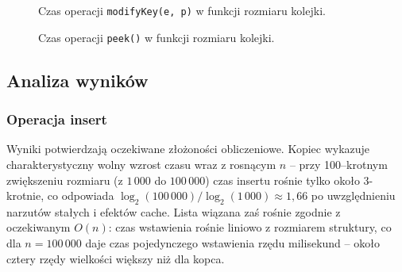 \begin{figure}[H]
\centering
{}
\caption{Czas operacji \texttt{modifyKey(e, p)} w funkcji rozmiaru kolejki.}
\end{figure}

\begin{figure}[H]
\centering
{}
\caption{Czas operacji \texttt{peek()} w funkcji rozmiaru kolejki.}
\end{figure}

\subsection{Analiza wyników}

\subsubsection{Operacja insert}

Wyniki potwierdzają oczekiwane złożoności obliczeniowe. Kopiec wykazuje
charakterystyczny wolny wzrost czasu wraz z rosnącym $n$ -- przy 100--krotnym
zwiększeniu rozmiaru (z $1\,000$ do $100\,000$) czas insertu rośnie tylko
około 3-krotnie, co odpowiada $\log_2(100\,000)/\log_2(1\,000) \approx 1{,}66$
po uwzględnieniu narzutów stałych i efektów cache. Lista wiązana zaś rośnie
zgodnie z oczekiwanym $O(n)$: czas wstawienia rośnie liniowo z rozmiarem
struktury, co dla $n = 100\,000$ daje czas pojedynczego wstawienia rzędu
milisekund -- około cztery rzędy wielkości większy niż dla kopca.

